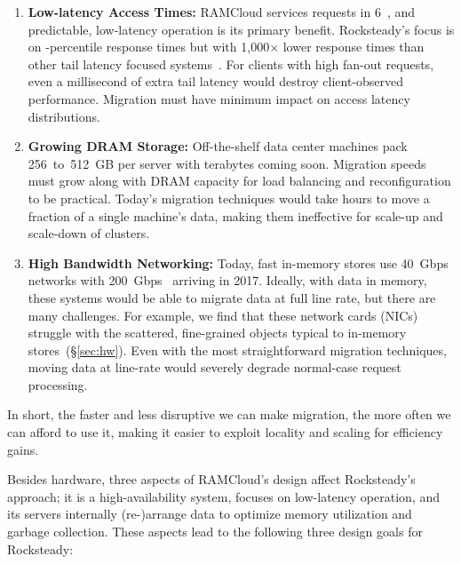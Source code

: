 \begin{enumerate}
\item {\bf Low-latency Access Times:}
RAMCloud services requests in 6~\us, and predictable, low-latency operation is
its primary benefit.  Rocksteady's focus is on \nnnth{}-percentile response
times but with 1,000$\times$ lower response times than other tail latency
focused systems~\cite{dynamo}. For clients with high fan-out requests, even
a millisecond of extra tail latency would destroy client-observed
performance. Migration must have minimum impact on access latency
distributions.

\item {\bf Growing DRAM Storage:}
Off-the-shelf data center machines pack 256~to~512~GB per server
with terabytes coming soon. Migration speeds must
grow along with DRAM capacity for load balancing and reconfiguration to be
practical. Today's migration techniques would take hours
to move a fraction of a single machine's data, making them ineffective for
scale-up and scale-down of clusters.

\item {\bf High Bandwidth Networking:}
Today, fast in-memory stores use 40~Gbps networks with
200~Gbps~\cite{mellanox-cx6} arriving in 2017. Ideally, with data in memory, these
systems would be able to migrate data at full line rate, but there are many
challenges. For example, we find that these network cards (NICs)
struggle with the scattered, fine-grained objects typical to in-memory
stores~(\S\ref{sec:hw}).  Even with the most straightforward migration
techniques, moving data at line-rate would severely degrade
normal-case request processing.

\end{enumerate}

In short, the faster and less disruptive we can make migration, the more often we can
afford to use it, making it easier to exploit locality and scaling for efficiency gains.

Besides hardware, three aspects of RAMCloud's design affect Rocksteady's
approach; it is a high-availability system, focuses on low-latency
operation, and its servers internally (re-)arrange data to optimize memory
utilization and garbage collection. These aspects lead to the following
three design goals for Rocksteady:

